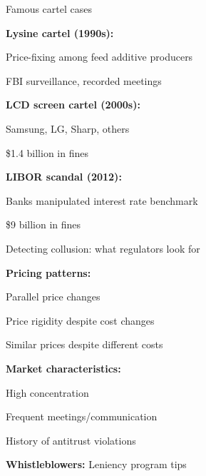 \documentclass[notes,11pt, aspectratio=169]{beamer}
\newenvironment{wideitemize}{\itemize\addtolength{\itemsep}{10pt}}{\enditemize}
\begin{document}
\begin{frame}{Famous cartel cases}
	\begin{wideitemize}
		\item \textbf{Lysine cartel (1990s):}
		\begin{wideitemize}
			\vspace{5pt}
			\item Price-fixing among feed additive producers
			\item FBI surveillance, recorded meetings
		\end{wideitemize}
		\item \textbf{LCD screen cartel (2000s):}
		\begin{wideitemize}
			\vspace{5pt}
			\item Samsung, LG, Sharp, others
			\item \$1.4 billion in fines
		\end{wideitemize}
		\item \textbf{LIBOR scandal (2012):}
		\begin{wideitemize}
			\vspace{5pt}
			\item Banks manipulated interest rate benchmark
			\item \$9 billion in fines
		\end{wideitemize}
	\end{wideitemize}
\end{frame}

\begin{frame}{Detecting collusion: what regulators look for}
	\begin{wideitemize}
		\item \textbf{Pricing patterns:}
		\begin{wideitemize}
			\vspace{5pt}
			\item Parallel price changes
			\item Price rigidity despite cost changes
			\item Similar prices despite different costs
		\end{wideitemize}
		\item \textbf{Market characteristics:}
		\begin{wideitemize}
			\vspace{5pt}
			\item High concentration
			\item Frequent meetings/communication
			\item History of antitrust violations
		\end{wideitemize}
		\item \textbf{Whistleblowers:} Leniency program tips
	\end{wideitemize}
\end{frame}
\end{document}
